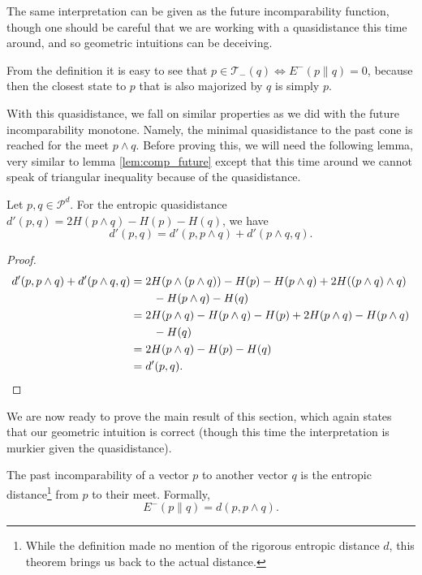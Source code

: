 The same interpretation can be given as the future incomparability function, though one should be careful that we are working with a quasidistance this time around, and so geometric intuitions can be deceiving.

\begin{remark}
    From the definition it is easy to see that $p \in \mathcal{T}_-(q) \iff E^-(p \parallel q) = 0$, because then the closest state to $p$ that is also majorized by $q$ is simply $p$.
\end{remark}

With this quasidistance, we fall on similar properties as we did with the future incomparability monotone. Namely, the minimal quasidistance to the past cone is reached for the meet $p \wedge q$. Before proving this, we will need the following lemma, very similar to lemma \ref{lem:comp_future} except that this time around we cannot speak of triangular inequality because of the quasidistance.

\begin{lemma} \label{lem:comp_past}
    Let $p, q \in \mathcal{P}^d$. For the entropic quasidistance $d'(p, q) = 2H(p \wedge q) - H(p) - H(q)$, we have
    \begin{equation}
        d'(p, q) = d'(p, p \wedge q) + d'(p \wedge q, q).
    \end{equation}
\end{lemma}

\begin{proof}
    \begin{align}
        d'(p, p \wedge q) + d'(p \wedge q, q) &= 2H(p \wedge (p \wedge q)) - H(p) - H(p \wedge q) + 2H((p \wedge q) \wedge q) \nonumber\\
        &\quad \quad - H(p \wedge q) - H(q)\\
        &= 2H(p \wedge q) - H(p \wedge q) - H(p) + 2H(p \wedge q) - H(p \wedge q)\nonumber\\
        &\quad \quad - H(q) \\
        &= 2H(p \wedge q) - H(p) - H(q) \\
        &= d'(p, q). \qedhere
    \end{align} 
\end{proof}

We are now ready to prove the main result of this section, which again states that our geometric intuition is correct (though this time the interpretation is murkier given the quasidistance).

\begin{theorem}
    The past incomparability of a vector $p$ to another vector $q$ is the entropic distance\footnote{While the definition made no mention of the rigorous entropic distance $d$, this theorem brings us back to the actual distance.} from $p$ to their meet. Formally,
    \begin{equation}
        E^- (p \parallel q) = d(p, p \wedge q).
    \end{equation}
\end{theorem}

